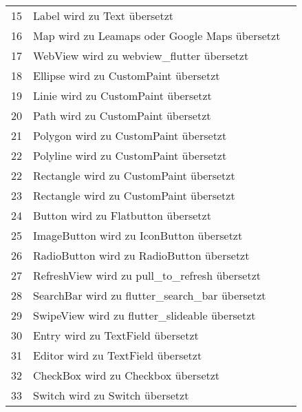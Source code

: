 \begin{xltabular}{\textwidth}{l|X|l}
	15            			& Label       							wird zu  		Text 				übersetzt	 &  \checkmark   	\\ 
	 
	16            			& Map            						wird zu	   		Leamaps oder Google Maps übersetzt &  \checkmark   	\\ 
	17            			& WebView            				wird zu  		webview\_flutter	übersetzt &  \checkmark   	\\
	18            			& Ellipse								wird zu  		CustomPaint	übersetzt &  \checkmark   	\\
	19            			& Linie									wird zu	  		CustomPaint	übersetzt &  \checkmark   	\\
	20            			& Path  								wird zu  		CustomPaint	übersetzt &  \checkmark   	\\
	21           			& Polygon  							wird zu  		CustomPaint	übersetzt &  \checkmark   	\\ 
	22            			& Polyline    	wird zu  		CustomPaint	übersetzt &  \checkmark   	\\
	22            			&  Rectangle  	wird zu  		CustomPaint	übersetzt &  \checkmark   	\\
	23            			& Rectangle  						wird zu  		CustomPaint	übersetzt &  \checkmark   	\\
	24           			& Button		       					wird zu  		Flatbutton 		übersetzt &  \checkmark   	\\
	25            			& ImageButton		       			wird zu  		IconButton 		übersetzt &  \checkmark   	\\
	26            			& RadioButton		       			wird zu  		RadioButton 		übersetzt &  \checkmark   	\\
	27            			& RefreshView		       			wird zu  		pull\_to\_refresh 		übersetzt &  \checkmark   	\\
	28            			& SearchBar		       				wird zu  		flutter\_search\_bar 	übersetzt &  \checkmark   	\\
	29            			& SwipeView		       			wird zu 		flutter\_slideable 		übersetzt &  \checkmark   	\\
	30            			& Entry		       						wird zu  		TextField	 		übersetzt &  \checkmark   	\\
	31           			& Editor		       					wird zu  		TextField	 		übersetzt &  \checkmark   	\\
	32            			& CheckBox		       				wird zu 		Checkbox	 		übersetzt &  \checkmark   	\\
	33            			& Switch		       					wird zu  		Switch	 		übersetzt &  \checkmark   	\\

\end{xltabular}
